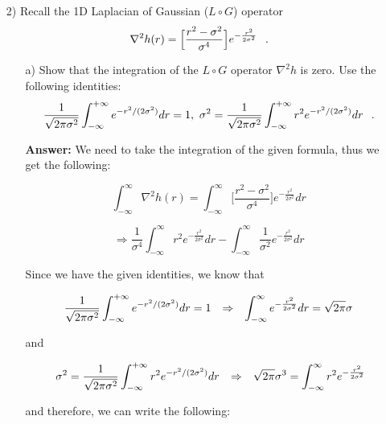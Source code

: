 \documentclass{article}
\begin{document}
\begin{enumerate}
\item[2)] Recall the 1D Laplacian of Gaussian ($L \circ G$) operator 
$$\nabla^2 h(r)= \Big[\frac{r^2-\sigma^2}{\sigma^4}\Big]e^{-\frac{r^2}{2\sigma^2}} \hspace{0.1in}.$$ 

\begin{enumerate}
\item[a)] Show that the integration of the $L \circ G$ operator $\nabla^2 h$ is zero. Use the following identities: 
$$\frac{1}{\sqrt{2\pi\sigma^2}}\int_{-\infty}^{+\infty}e^{-r^2/(2\sigma^2)}dr=1, \ \sigma^2=\frac{1}{\sqrt{2\pi\sigma^2}}\int_{-\infty}^{+\infty}r^2e^{-r^2/(2\sigma^2)}dr \hspace{0.1in} .$$

\textbf{Answer: }We need to take the integration of the given formula, thus we get the following:

\begin{equation}
\int_{-\infty}^{\infty} \nabla^2 h(r) = \int_{-\infty}^{\infty} \Big[\frac{r^2-\sigma^2}{\sigma^4}\Big]e^{-\frac{r^2}{2\sigma^2}} dr
\end{equation}

\begin{equation}
\Rightarrow \frac{1}{\sigma ^ 4} \int_{-\infty}^{\infty} r^2 e^{-\frac{r^2}{2\sigma^2}} dr - \int_{-\infty}^{\infty} \frac{1}{\sigma ^ 2} e^{-\frac{r^2}{2\sigma^2}} dr
\end{equation}

Since we have the given identities, we know that 

\begin{equation}
\frac{1}{\sqrt{2\pi\sigma^2}}\int_{-\infty}^{+\infty}e^{-r^2/(2\sigma^2)}dr = 1 \hspace{0.1in} \Rightarrow \hspace{0.1in} \int_{-\infty}^{\infty} e^{-\frac{r^2}{2 \sigma^2}} dr = \sqrt{2 \pi} \sigma
\end{equation}

and

\begin{equation}
\ \sigma^2=\frac{1}{\sqrt{2\pi\sigma^2}}\int_{-\infty}^{+\infty}r^2e^{-r^2/(2\sigma^2)} dr \hspace{0.1in} \Rightarrow \hspace{0.1in} \sqrt{2 \pi} \sigma ^ 3 = \int_{-\infty}^{\infty} r^2 e^{-\frac{r^2}{2 \sigma ^ 2}}
\end{equation}

and therefore, we can write the following:


\end{enumerate}
\end{enumerate}
\end{document}
